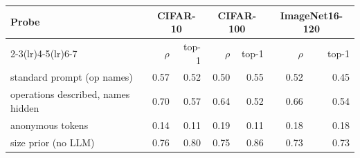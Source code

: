\begin{tabular}{@{}lrrrrrr@{}}
\toprule
\multirow{2}{*}{Probe} & \multicolumn{2}{c}{CIFAR-10} & \multicolumn{2}{c}{CIFAR-100} & \multicolumn{2}{c}{ImageNet16-120}\\
\cmidrule(lr){2-3}\cmidrule(lr){4-5}\cmidrule(lr){6-7}
 & $\rho$ & top-1 & $\rho$ & top-1 & $\rho$ & top-1\\
\midrule
standard prompt (op names) & 0.57 & 0.52 & 0.50 & 0.55 & 0.52 & 0.45\\
operations described, names hidden & 0.70 & 0.57 & 0.64 & 0.52 & 0.66 & 0.54\\
anonymous tokens & 0.14 & 0.11 & 0.19 & 0.11 & 0.18 & 0.18\\
size prior (no LLM) & 0.76 & 0.80 & 0.75 & 0.86 & 0.73 & 0.73\\
\bottomrule
\end{tabular}
